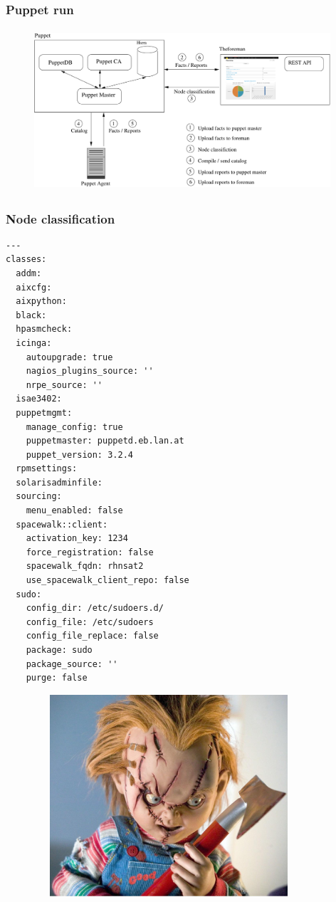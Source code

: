 \documentclass{beamer}
\begin{document}
\begin{frame}
  \frametitle{Puppet run}
  \begin{figure}[ht]
    \centering
      \includegraphics[height=6cm,width=11cm]{../pics/puppet_overview}
    \label{fig:stack}
  \end{figure}
\end{frame}

\begin{frame}[fragile]
  \frametitle{Node classification}
\begin{lstlisting}
---
classes:
  addm:
  aixcfg:
  aixpython:
  black:
  hpasmcheck:
  icinga:
    autoupgrade: true
    nagios_plugins_source: ''
    nrpe_source: ''
  isae3402:
  puppetmgmt:
    manage_config: true
    puppetmaster: puppetd.eb.lan.at
    puppet_version: 3.2.4
  rpmsettings:
  solarisadminfile:
  sourcing:
    menu_enabled: false
  spacewalk::client:
    activation_key: 1234
    force_registration: false
    spacewalk_fqdn: rhnsat2
    use_spacewalk_client_repo: false
  sudo:
    config_dir: /etc/sudoers.d/
    config_file: /etc/sudoers
    config_file_replace: false
    package: sudo
    package_source: ''
    purge: false
\end{lstlisting}
\end{frame}

\begin{frame}
\end{frame}

\begin{frame}
  \begin{figure}[ht]
    \centering
      \includegraphics[height=7.5cm,width=10cm]{../pics/chucky.png}
    \label{fig:stack}
  \end{figure}
\end{frame}
\end{document}
